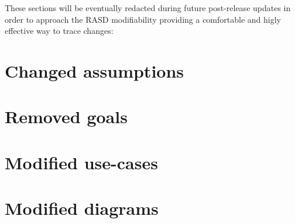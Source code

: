 These sections will be eventually redacted during future post-release updates in order to approach the RASD modifiability providing a comfortable and higly effective way to trace changes:

\section{Changed assumptions}
\section{Removed goals}
\section{Modified use-cases}
\section{Modified diagrams}
